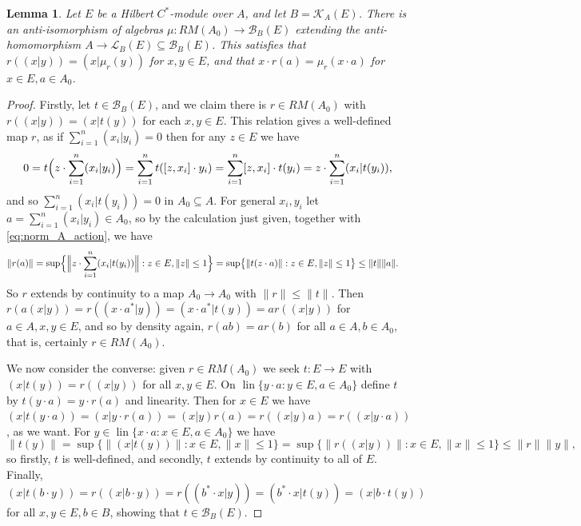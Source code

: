\documentclass[a4paper,11pt]{article}
\theoremstyle{plain}
\newtheorem{lemma}[proposition]{Lemma}
\theoremstyle{remark}
\newcommand{\mc}[1]{\mathcal{#1}}
\newcommand{\lin}{\operatorname{lin}}
\begin{document}
\begin{lemma}\label{lem:BBE_is_RMA}
Let $E$ be a Hilbert $C^*$-module over $A$, and let $B = \mc K_A(E)$.  There is an anti-isomorphism of algebras $\mu \colon RM(A_0) \to \mc B_B(E)$ extending the anti-homomorphism $A \to \mc L_B(E) \subseteq \mc B_B(E)$.  This satisfies that $r((x|y)) = (x|\mu_r(y))$ for $x,y\in E$, and that $x \cdot r(a) = \mu_r(x\cdot a)$ for $x\in E, a\in A_0$.
\end{lemma}
\begin{proof}

Firstly, let $t\in\mc B_B(E)$, and we claim there is $r\in RM(A_0)$ with $r((x|y)) = (x|t(y))$ for each $x,y\in E$.  This relation gives a well-defined map $r$, as if $\sum_{i=1}^n (x_i|y_i) = 0$ then for any $z\in E$ we have
\[ 0 = t\Bigl( z \cdot \sum_{i=1}^n (x_i|y_i) \Bigr)
= \sum_{i=1}^n t( [z,x_i] \cdot y_i)
= \sum_{i=1}^n [z,x_i] \cdot t(y_i)
= z \cdot \sum_{i=1}^n (x_i|t(y_i)), \]
and so $\sum_{i=1}^n (x_i|t(y_i)) = 0$ in $A_0 \subseteq A$.  For general $x_i, y_i$ let $a = \sum_{i=1}^n (x_i|y_i) \in A_0$, so by the calculation just given, together with \eqref{eq:norm_A_action}, we have
\begin{align*}
\| r(a) \|
&= \sup\Bigl\{ \Bigl\| z \cdot \sum_{i=1}^n (x_i|t(y_i)) \Bigr\| : z\in E, \|z\|\leq 1 \Bigr\} 
= \sup\bigl\{ \| t(z\cdot a) \| : z\in E, \|z\|\leq 1 \bigr\} \leq \|t\| \|a\|.
\end{align*}
So $r$ extends by continuity to a map $A_0\to A_0$ with $\|r\| \leq \|t\|$.  Then $r(a(x|y)) = r((x\cdot a^*|y)) = (x\cdot a^*|t(y)) = a r((x|y))$ for $a\in A, x,y\in E$, and so by density again, $r(ab) =ar(b)$ for all $a\in A, b\in A_0$, that is, certainly $r\in RM(A_0)$.

We now consider the converse: given $r\in RM(A_0)$ we seek $t\colon E\to E$ with $(x|t(y)) = r((x|y))$ for all $x,y\in E$.  On $\lin\{ y\cdot a : y\in E, a\in A_0 \}$ define $t$ by $t(y\cdot a) = y\cdot r(a)$ and linearity.  Then for $x\in E$ we have $(x|t(y\cdot a)) = (x|y\cdot r(a)) = (x|y) r(a) = r((x|y)a) = r((x|y\cdot a))$, as we want.  For $y \in \lin\{ x\cdot a : x\in E, a\in A_0 \}$ we have
\[ \|t(y)\| = \sup\bigl\{ \| (x|t(y)) \| : x\in E, \|x\|\leq 1 \bigr\}
= \sup\bigl\{ \| r( (x|y) ) \| : x\in E, \|x\|\leq 1 \bigr\}
\leq \|r\| \|y\|, \]
so firstly, $t$ is well-defined, and secondly, $t$ extends by continuity to all of $E$.  Finally, $(x|t(b\cdot y)) = r((x|b\cdot y)) = r((b^*\cdot x|y)) = (b^*\cdot x|t(y)) = (x|b\cdot t(y))$ for all $x,y\in E, b\in B$, showing that $t \in \mc B_B(E)$.


\end{proof}
\end{document}
